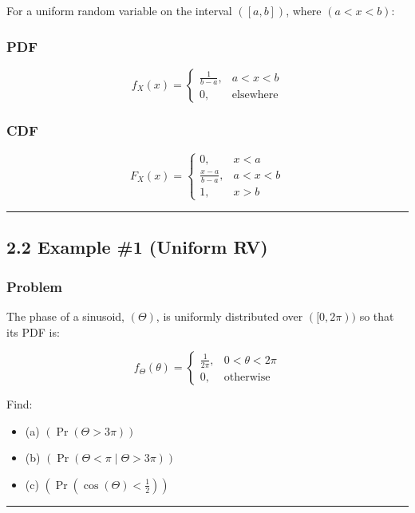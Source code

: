 \documentclass[12pt]{article}
\begin{document}
For a uniform random variable on the interval $([a,b])$, where $(a<x<b)$:

\subsubsection*{\textbf{PDF}}

\[
f_X(x)=
\begin{cases}
\frac{1}{b-a}, & a<x<b \\
0, & \text{elsewhere}
\end{cases}
\]

\subsubsection*{\textbf{CDF}}

\[
F_X(x)=
\begin{cases}
0, & x<a \\
\frac{x-a}{b-a}, & a<x<b \\
1, & x>b
\end{cases}
\]

\hrule
\vspace{1em}

\subsection*{\textbf{2.2 Example \#1 (Uniform RV)}}

\subsubsection*{\textbf{Problem}}

The phase of a sinusoid, $(\Theta)$, is uniformly distributed over $([0,2\pi))$ so that its PDF is:

\[
f_\Theta(\theta)=
\begin{cases}
\frac{1}{2\pi}, & 0<\theta<2\pi \\
0, & \text{otherwise}
\end{cases}
\]

Find:

\begin{itemize}
    \item (a) $(\Pr(\Theta > 3\pi))$
    \item (b) $(\Pr(\Theta < \pi \mid \Theta > 3\pi))$
    \item (c) $(\Pr(\cos(\Theta) < \frac{1}{2}))$
\end{itemize}

\hrule
\vspace{1em}
\end{document}
